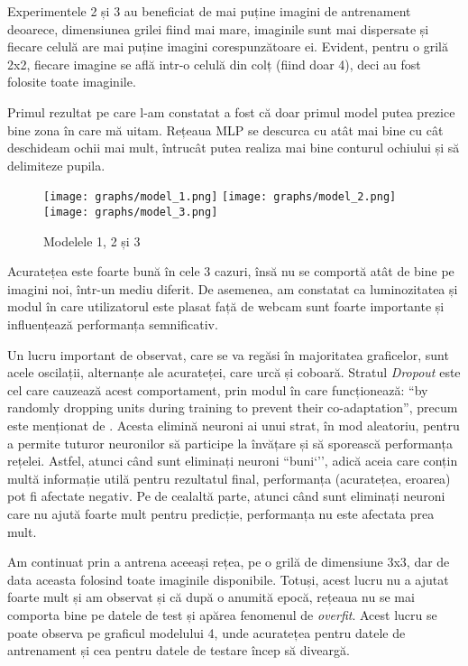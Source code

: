 Experimentele 2 și 3 au beneficiat de mai puține imagini de antrenament deoarece, dimensiunea grilei fiind mai mare, imaginile sunt mai dispersate și fiecare celulă are mai puține imagini corespunzătoare ei.
Evident, pentru o grilă 2x2, fiecare imagine se află intr-o celulă din colț (fiind doar 4), deci au fost folosite toate imaginile.


Primul rezultat pe care l-am constatat a fost că doar primul model putea prezice bine zona în care mă uitam.
Rețeaua MLP se descurca cu atât mai bine cu cât deschideam ochii mai mult, întrucât putea realiza mai bine conturul ochiului și să delimiteze pupila.

\begin{figure}[ht]
    \centering
    \texttt{[image: graphs/model\_1.png]}
    \texttt{[image: graphs/model\_2.png]}
    \texttt{[image: graphs/model\_3.png]}
    \caption{Modelele 1, 2 și 3}
\end{figure}


Acuratețea este foarte bună în cele 3 cazuri, însă nu se comportă atât de bine pe imagini noi, într-un mediu diferit.
De asemenea, am constatat ca luminozitatea și modul în care utilizatorul este plasat față de webcam sunt foarte importante și influențează performanța semnificativ.


Un lucru important de observat, care se va regăsi în majoritatea graficelor, sunt acele oscilații, alternanțe ale acurateței, care urcă și coboară.
Stratul \emph{Dropout} este cel care cauzează acest comportament, prin modul în care funcționează: ``by randomly dropping units during training to prevent their co-adaptation'', precum este menționat de \cite{dropout_algorithm}.
Acesta elimină neuroni ai unui strat, în mod aleatoriu, pentru a permite tuturor neuronilor să participe la învățare și să sporească performanța rețelei.
Astfel, atunci când sunt eliminați neuroni ``buni`'', adică aceia care conțin multă informație utilă pentru rezultatul final, performanța (acuratețea, eroarea) pot fi afectate negativ.
Pe de cealaltă parte, atunci când sunt eliminați neuroni care nu ajută foarte mult pentru predicție, performanța nu este afectata prea mult.


Am continuat prin a antrena aceeași rețea, pe o grilă de dimensiune 3x3, dar de data aceasta folosind toate imaginile disponibile.
Totuși, acest lucru nu a ajutat foarte mult și am observat și că după o anumită epocă, rețeaua nu se mai comporta bine pe datele de test și apărea fenomenul de \emph{overfit}.
Acest lucru se poate observa pe graficul modelului 4, unde acuratețea pentru datele de antrenament și cea pentru datele de testare încep să diveargă.

